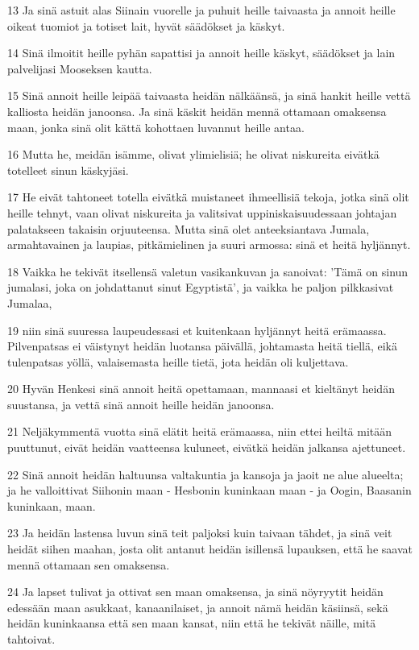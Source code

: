 \par 13 Ja sinä astuit alas Siinain vuorelle ja puhuit heille taivaasta ja annoit heille oikeat tuomiot ja totiset lait, hyvät säädökset ja käskyt.
\par 14 Sinä ilmoitit heille pyhän sapattisi ja annoit heille käskyt, säädökset ja lain palvelijasi Mooseksen kautta.
\par 15 Sinä annoit heille leipää taivaasta heidän nälkäänsä, ja sinä hankit heille vettä kalliosta heidän janoonsa. Ja sinä käskit heidän mennä ottamaan omaksensa maan, jonka sinä olit kättä kohottaen luvannut heille antaa.
\par 16 Mutta he, meidän isämme, olivat ylimielisiä; he olivat niskureita eivätkä totelleet sinun käskyjäsi.
\par 17 He eivät tahtoneet totella eivätkä muistaneet ihmeellisiä tekoja, jotka sinä olit heille tehnyt, vaan olivat niskureita ja valitsivat uppiniskaisuudessaan johtajan palatakseen takaisin orjuuteensa. Mutta sinä olet anteeksiantava Jumala, armahtavainen ja laupias, pitkämielinen ja suuri armossa: sinä et heitä hyljännyt.
\par 18 Vaikka he tekivät itsellensä valetun vasikankuvan ja sanoivat: 'Tämä on sinun jumalasi, joka on johdattanut sinut Egyptistä', ja vaikka he paljon pilkkasivat Jumalaa,
\par 19 niin sinä suuressa laupeudessasi et kuitenkaan hyljännyt heitä erämaassa. Pilvenpatsas ei väistynyt heidän luotansa päivällä, johtamasta heitä tiellä, eikä tulenpatsas yöllä, valaisemasta heille tietä, jota heidän oli kuljettava.
\par 20 Hyvän Henkesi sinä annoit heitä opettamaan, mannaasi et kieltänyt heidän suustansa, ja vettä sinä annoit heille heidän janoonsa.
\par 21 Neljäkymmentä vuotta sinä elätit heitä erämaassa, niin ettei heiltä mitään puuttunut, eivät heidän vaatteensa kuluneet, eivätkä heidän jalkansa ajettuneet.
\par 22 Sinä annoit heidän haltuunsa valtakuntia ja kansoja ja jaoit ne alue alueelta; ja he valloittivat Siihonin maan - Hesbonin kuninkaan maan - ja Oogin, Baasanin kuninkaan, maan.
\par 23 Ja heidän lastensa luvun sinä teit paljoksi kuin taivaan tähdet, ja sinä veit heidät siihen maahan, josta olit antanut heidän isillensä lupauksen, että he saavat mennä ottamaan sen omaksensa.
\par 24 Ja lapset tulivat ja ottivat sen maan omaksensa, ja sinä nöyryytit heidän edessään maan asukkaat, kanaanilaiset, ja annoit nämä heidän käsiinsä, sekä heidän kuninkaansa että sen maan kansat, niin että he tekivät näille, mitä tahtoivat.
